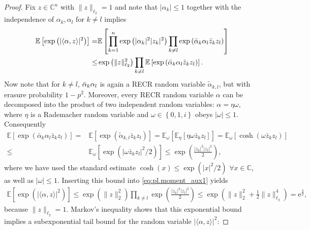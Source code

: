 \begin{proof}
Fix $ z \in \mathbb{C}^n$ with $\|  z \|_{\ell_2}=1$ and note that $|\alpha_k| \leq 1$ together with the independence of $\alpha_k,\alpha_l$ for $k \neq l$ implies
\begin{align}
  \mathbb{E} \left[ \exp \left( | \langle \alpha,  z \rangle|^2 \right) \right]
  =& \mathbb{E} \left[ \prod_{k=1}^n \exp \left( | \alpha_k|^2 |z_k|^2 \right) \prod_{k \neq l} \exp \left( \bar{\alpha}_k \alpha_l \bar{z}_k z_l \right) \right] \nonumber \\
  \leq& \exp \left( \|  z \|_{\ell_2}^2 \right) \prod_{k \neq l} \mathbb{E} \left[  \exp \left( \bar{\alpha}_k \alpha_l \bar{z}_k z_l \right)  \right]. \label{eq:pl.moment_aux1}
\end{align}
Now note that for $k \neq l$, $\bar{\alpha}_k \alpha_l$ is again a RECR random variable $\tilde{\alpha}_{k,l}$, but with erasure probability $1-p^2$.
Moreover, every RECR random variable $\alpha$ can be decomposed into the product of two independent random variables: $ \alpha= \eta \omega$, where $\eta$ is a Rademacher random variable and $\omega \in \left\{0, 1,i \right\}$ obeys $| \omega | \leq 1$.
Consequently
\begin{align}
  \mathbb{E} \left[ \exp \left( \bar{\alpha}_k \alpha_l \bar{z}_k z_l \right) \right]
  =& \mathbb{E} \left[ \exp \left( \tilde{\alpha}_{k,l} \bar{z}_k z_l \right) \right]
  = \mathbb{E}_{\omega} \left[ \mathbb{E}_\eta \left[ \eta \omega \bar{z}_k  z_l \right] \right]
  = \mathbb{E}_{\omega} \left[ \cosh \left( \omega \bar{z}_k z_l \right) \right] \\
  \leq & \mathbb{E}_\omega \left[ \exp \left( |\omega \bar{z}_k z_l|^2/2 \right) \right]
  \leq  \exp \left( \frac{|z_k|^2 |z_l|^2}{2} \right),
\end{align}
where we have used the standard estimate $\cosh (x) \leq \exp \left( |x|^2/2 \right)$ $\forall x \in \mathbb{C}$, as well as $| \omega| \leq 1$. Inserting this bound into \eqref{eq:pl.moment_aux1} yields
\begin{align}
  \mathbb{E} \left[ \exp \left( | \langle  \alpha,  z \rangle|^2 \right) \right]
  \leq \exp \left( \|  z \|_2^2 \right) \prod_{k \neq l} \exp \left( \frac{|z_k|^2 |z_l|^2}{2} \right)
  \leq \exp \left( \|  z \|_2^2 + \frac{1}{2}\|  z \|_{\ell_2}^4 \right) = \mathrm{e}^{\frac{3}{2}},
\end{align}
because $\|  z \|_{\ell_2}=1$.
Markov's inequality shows that this exponential bound implies a subexponential tail bound for the random variable $| \langle  \alpha, z \rangle|^2$:

\end{proof}
